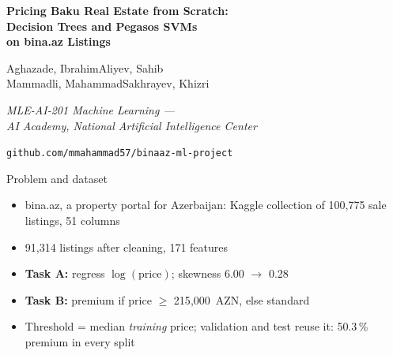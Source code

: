 \documentclass[14pt,aspectratio=169]{beamer}
\newcommand{\gap}{\setlength{\itemsep}{0.45em}}
\begin{document}
\begin{frame}[plain]
  \centering
  \vfill
  {\Large\bfseries\color{accent}
    Pricing Baku Real Estate from Scratch:\\[0.15em]
    Decision Trees and Pegasos SVMs\\[0.15em]
    on bina.az Listings\par}
  \vspace{1.1em}
  Aghazade, Ibrahim\quad Aliyev, Sahib\\
  Mammadli, Mahammad\quad Sakhrayev, Khizri\par
  \vspace{0.9em}
  {\itshape\color{muted}MLE-AI-201 Machine Learning ---\\
    AI Academy, National Artificial Intelligence Center\par}
  \vspace{0.9em}
  \texttt{github.com/mmahammad57/binaaz-ml-project}\par
  \vfill
\end{frame}

\begin{frame}{Problem and dataset}
  \begin{itemize}\gap
    \item bina.az, a property portal for Azerbaijan: Kaggle collection of
      100{,}775 sale listings, 51 columns %
    \item 91{,}314 listings after cleaning, 171 features %
    \item \textbf{Task A:} regress $\log(\text{price})$; skewness 6.00 $\to$ 0.28 %
    \item \textbf{Task B:} premium if price $\ge$ 215{,}000~AZN, else standard %
    \item Threshold = median \emph{training} price; validation and test
      reuse it: 50.3\,\% premium in every split %
  \end{itemize}
\end{frame}
\end{document}
